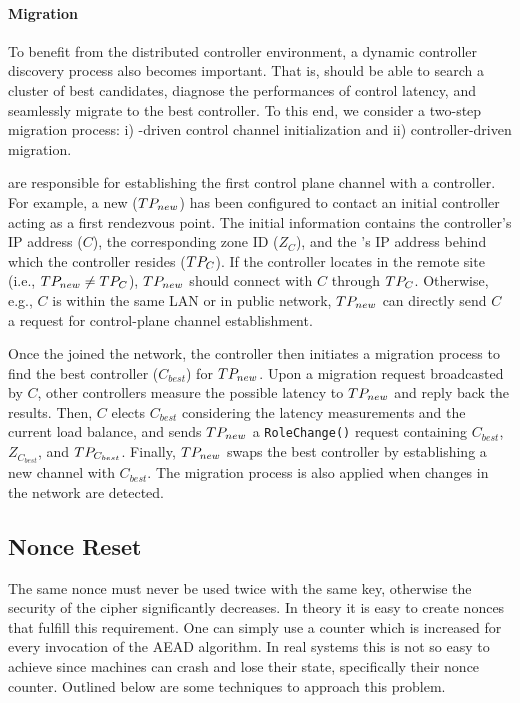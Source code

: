 \paragraph{\tp Migration}
To benefit from the distributed controller environment, a dynamic controller discovery 
process also becomes important. That is, \tps should be able to search a cluster of best 
candidates, diagnose the performances of control latency, and seamlessly migrate to the 
best controller. To this end, we consider a two-step migration process: i) \tp-driven
control channel initialization and ii) controller-driven \tp migration. 

\tps are responsible for establishing the first control plane channel with a controller.
For example, a new \tp ($TP_{new}$) has been configured to contact an initial controller
acting as a first rendezvous point. 
The initial information contains the controller's IP address 
($C$), the corresponding zone ID ($Z_{C}$), and the \tp's IP address behind which the controller 
resides ($TP_{C}$). If the controller locates in the remote site (i.e., $TP_{new} 
\neq TP_{C}$), $TP_{new}$ should connect with $C$ through $TP_{C}$. Otherwise, e.g.,
$C$ is within the same LAN or in public network, $TP_{new}$ can directly send $C$ a request
for control-plane channel establishment. 

Once the \tp joined the network, the controller then initiates a migration process to 
find the best controller ($C_{best}$) for $TP_{new}$. Upon a migration request broadcasted
by $C$, other controllers measure the possible latency to $TP_{new}$ and reply back
the results. Then, $C$ elects $C_{best}$ considering the latency measurements and the
current load balance, and sends $TP_{new}$ a \texttt{RoleChange()} request containing
$C_{best}$, $Z_{C_{best}}$, and $TP_{C_{best}}$. Finally, $TP_{new}$ swaps the best
controller by establishing a new channel with $C_{best}$. The migration process
is also applied when changes in the network are detected.


\subsection{Nonce Reset}
\label{ssec:nonce}
The same nonce must never be used twice with the same key, otherwise the security of the 
cipher significantly decreases. In theory it is easy to create nonces that fulfill this 
requirement. One can simply use a counter which is increased for every invocation of the 
AEAD algorithm. In real systems this is not so easy to achieve since machines can crash 
and lose their state, specifically their nonce counter. Outlined below are some techniques 
to approach this problem.

